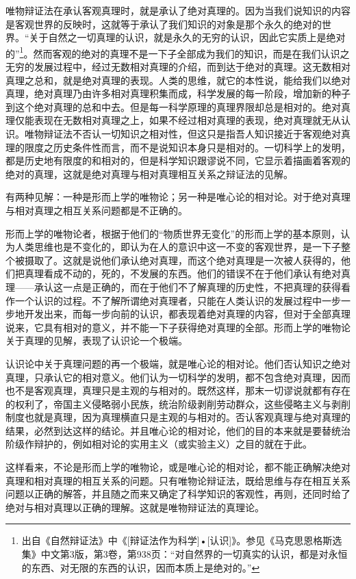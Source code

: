 \documentclass[UTF8, 12pt, a4paper]{ctexrep}
\begin{document}
唯物辩证法在承认客观真理时，就是承认了绝对真理的。因为当我们说知识的内容是客观世界的反映时，这就等于承认了我们知识的对象是那个永久的绝对的世界。“关于自然之一切真理的认识，就是永久的无穷的认识，因此它实质上是绝对的”\footnote{出自《自然辩证法》中《[辩证法作为科学]•[认识]》。参见《马克思恩格斯选集》中文第3版，第3卷，第938页：“对自然界的一切真实的认识，都是对永恒的东西、对无限的东西的认识，因而本质上是绝对的。”}。然而客观的绝对的真理不是一下子全部成为我们的知识，而是在我们认识之无穷的发展过程中，经过无数相对真理的介绍，而到达于绝对的真理。这无数相对真理之总和，就是绝对真理的表现。人类的思维，就它的本性说，能给我们以绝对真理，绝对真理乃由许多相对真理积集而成，科学发展的每一阶段，增加新的种子到这个绝对真理的总和中去。但是每一科学原理的真理界限却总是相对的。绝对真理仅能表现在无数相对真理之上，如果不经过相对真理的表现，绝对真理就无从认识。唯物辩证法不否认一切知识之相对性，但这只是指吾人知识接近于客观绝对真理的限度之历史条件性而言，而不是说知识本身只是相对的。一切科学上的发明，都是历史地有限度的和相对的，但是科学知识跟谬说不同，它显示着描画着客观的绝对的真理，这就是绝对真理与相对真理相互关系之辩证法的见解。

有两种见解：一种是形而上学的唯物论；另一种是唯心论的相对论。对于绝对真理与相对真理之相互关系问题都是不正确的。

形而上学的唯物论者，根据于他们的“物质世界无变化”的形而上学的基本原则，认为人类思维也是不变化的，即认为在人的意识中这一不变的客观世界，是一下子整个被摄取了。这就是说他们承认绝对真理，而这个绝对真理是一次被人获得的，他们把真理看成不动的，死的，不发展的东西。他们的错误不在于他们承认有绝对真理——承认这一点是正确的，而在于他们不了解真理的历史性，不把真理的获得看作一个认识的过程。不了解所谓绝对真理者，只能在人类认识的发展过程中一步一步地开发出来，而每一步向前的认识，都表现着绝对真理的内容，但对于全部真理说来，它具有相对的意义，并不能一下子获得绝对真理的全部。形而上学的唯物论关于真理的见解，表现了认识论一个极端。

认识论中关于真理问题的再一个极端，就是唯心论的相对论。他们否认知识之绝对真理，只承认它的相对意义。他们认为一切科学的发明，都不包含绝对真理，因而也不是客观真理，真理只是主观的与相对的。既然这样，那末一切谬说就都有存在的权利了，帝国主义侵略弱小民族，统治阶级剥削劳动群众，这些侵略主义与剥削制度也就是真理，因为真理横直只是主观的与相对的。否认客观真理与绝对真理的结果，必然到达这样的结论。并且唯心论的相对论，他们的目的本来就是要替统治阶级作辩护的，例如相对论的实用主义（或实验主义）之目的就在于此。

这样看来，不论是形而上学的唯物论，或是唯心论的相对论，都不能正确解决绝对真理和相对真理的相互关系的问题。只有唯物论辩证法，既给思维与存在相互关系问题以正确的解答，并且随之而来又确定了科学知识的客观性，再则，还同时给了绝对与相对真理以正确的理解。这就是唯物辩证法的真理论。
\end{document}

